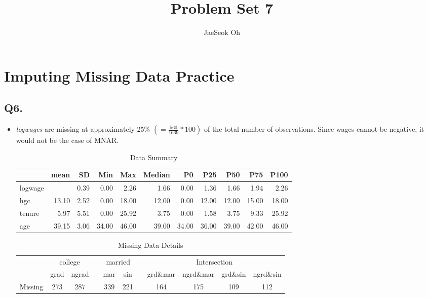 \documentclass{article}
\title{Problem Set 7}
\author{JaeSeok Oh}
\begin{document}
	\maketitle
	

\section*{Imputing Missing Data Practice}
\subsection*{Q6.}
	\begin{itemize}
		\item \textit{logwages} are missing at approximately 25\% $\left( =  \displaystyle\frac{560}{1669} * 100 \right)$ of the total number of observations.  Since wages cannot be negative, it would not be the case of MNAR.
		\begin{table}[h]
			\centering
			\caption{Data Summary}
			\begin{tabular}[t]{lrrrrrrrrrr}\toprule  & mean & SD & Min & Max & Median & P0 & P25 & P50 & P75 & P100\\\midrule
				logwage &  & \num{0.39} & \num{0.00} & \num{2.26} & \num{1.66} & \num{0.00} & \num{1.36} & \num{1.66} & \num{1.94} & \num{2.26}\\hgc & \num{13.10} & \num{2.52} & \num{0.00} & \num{18.00} & \num{12.00} & \num{0.00} & \num{12.00} & \num{12.00} & \num{15.00} & \num{18.00}\\tenure & \num{5.97} & \num{5.51} & \num{0.00} & \num{25.92} & \num{3.75} & \num{0.00} & \num{1.58} & \num{3.75} & \num{9.33} & \num{25.92}\\age & \num{39.15} & \num{3.06} & \num{34.00} & \num{46.00} & \num{39.00} & \num{34.00} & \num{36.00} & \num{39.00} & \num{42.00} & \num{46.00}\\\bottomrule
			\end{tabular}
		\end{table}
		\begin{table}[h]
			\centering
			\caption{Missing Data Details}
			\begin{tabular}[t]{ccccccccccc}
				\toprule
				& \multicolumn{2}{c}{college} && \multicolumn{2}{c}{married} && \multicolumn{4}{c}{Intersection} \\\cline{2-3} \cline{5-6} \cline{8-11}
				& grad & ngrad & & mar & sin && grd\&mar & ngrd\&mar & grd\&sin &ngrd\&sin  \\\midrule
				Missing &273 & 287& & 339 & 221 &&164&175&109&112 \\

\end{tabular}
\end{table}
\end{itemize}
\end{document}

